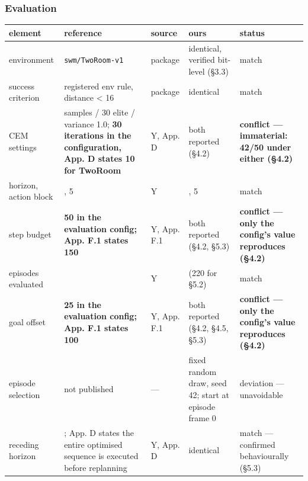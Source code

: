 \documentclass[10pt]{article}
\newcounter{none}
\begin{document}
\subsubsection{Evaluation}\label{evaluation}

{\def\LTcaptype{none} %
\begin{longtable}[]{@{}
  >{\raggedright\arraybackslash}p{}
  >{\raggedright\arraybackslash}p{}
  >{\raggedright\arraybackslash}p{}
  >{\raggedright\arraybackslash}p{}
  >{\raggedright\arraybackslash}p{}@{}}
\toprule\noalign{}
\begin{minipage}[b]{\linewidth}\raggedright
element
\end{minipage} & \begin{minipage}[b]{\linewidth}\raggedright
reference
\end{minipage} & \begin{minipage}[b]{\linewidth}\raggedright
source
\end{minipage} & \begin{minipage}[b]{\linewidth}\raggedright
ours
\end{minipage} & \begin{minipage}[b]{\linewidth}\raggedright
status
\end{minipage} \\
\midrule\noalign{}
\endhead
\bottomrule\noalign{}
\endlastfoot
environment & \texttt{swm/TwoRoom-v1} & package & identical, verified bit-level (\S{}3.3) & match \\
success criterion & registered env rule, distance \textless{} 16 & package & identical & match \\
CEM settings & 300 samples / 30 elite / variance 1.0; \textbf{30 iterations in the configuration, App. D states 10 for TwoRoom} & Y, App. D & both reported (\S{}4.2) & \textbf{conflict --- immaterial: 42/50 under either (\S{}4.2)} \\
horizon, action block & 5, 5 & Y & 5, 5 & match \\
step budget & \textbf{50 in the evaluation config; App. F.1 states 150} & Y, App. F.1 & both reported (\S{}4.2, \S{}5.3) & \textbf{conflict --- only the config's value reproduces (\S{}4.2)} \\
episodes evaluated & 50 & Y & 50 (220 for \S{}5.2) & match \\
goal offset & \textbf{25 in the evaluation config; App. F.1 states 100} & Y, App. F.1 & both reported (\S{}4.2, \S{}4.5, \S{}5.3) & \textbf{conflict --- only the config's value reproduces (\S{}4.2)} \\
episode selection & not published & --- & fixed random draw, seed 42; start at episode frame 0 & deviation --- unavoidable \\
receding horizon & 5; App. D states the entire optimised sequence is executed before replanning & Y, App. D & identical & match --- confirmed behaviourally (\S{}5.3) \\
\end{longtable}
}
\end{document}
